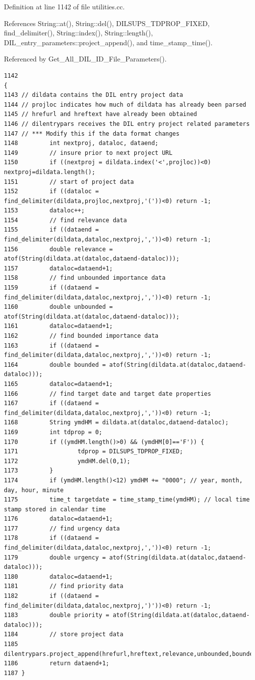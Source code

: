 Definition at line 1142 of file utilities.cc.

References String::at(), String::del(), DILSUPS\_\-TDPROP\_\-FIXED, find\_\-delimiter(), String::index(), String::length(), DIL\_\-entry\_\-parameters::project\_\-append(), and time\_\-stamp\_\-time().

Referenced by Get\_\-All\_\-DIL\_\-ID\_\-File\_\-Parameters().



\footnotesize\begin{verbatim}1142                                                                                                                                                  {
1143 // dildata contains the DIL entry project data
1144 // projloc indicates how much of dildata has already been parsed
1145 // hrefurl and hreftext have already been obtained
1146 // dilentrypars receives the DIL entry project related parameters
1147 // *** Modify this if the data format changes
1148         int nextproj, dataloc, dataend;
1149         // insure prior to next project URL
1150         if ((nextproj = dildata.index('<',projloc))<0) nextproj=dildata.length();
1151         // start of project data
1152         if ((dataloc = find_delimiter(dildata,projloc,nextproj,'('))<0) return -1;
1153         dataloc++;
1154         // find relevance data
1155         if ((dataend = find_delimiter(dildata,dataloc,nextproj,','))<0) return -1;
1156         double relevance = atof(String(dildata.at(dataloc,dataend-dataloc)));
1157         dataloc=dataend+1;
1158         // find unbounded importance data
1159         if ((dataend = find_delimiter(dildata,dataloc,nextproj,','))<0) return -1;
1160         double unbounded = atof(String(dildata.at(dataloc,dataend-dataloc)));
1161         dataloc=dataend+1;
1162         // find bounded importance data
1163         if ((dataend = find_delimiter(dildata,dataloc,nextproj,','))<0) return -1;
1164         double bounded = atof(String(dildata.at(dataloc,dataend-dataloc)));
1165         dataloc=dataend+1;
1166         // find target date and target date properties
1167         if ((dataend = find_delimiter(dildata,dataloc,nextproj,','))<0) return -1;
1168         String ymdHM = dildata.at(dataloc,dataend-dataloc);
1169         int tdprop = 0;
1170         if ((ymdHM.length()>0) && (ymdHM[0]=='F')) {
1171                 tdprop = DILSUPS_TDPROP_FIXED;
1172                 ymdHM.del(0,1);
1173         }
1174         if (ymdHM.length()<12) ymdHM += "0000"; // year, month, day, hour, minute
1175         time_t targetdate = time_stamp_time(ymdHM); // local time stamp stored in calendar time
1176         dataloc=dataend+1;
1177         // find urgency data
1178         if ((dataend = find_delimiter(dildata,dataloc,nextproj,','))<0) return -1;
1179         double urgency = atof(String(dildata.at(dataloc,dataend-dataloc)));
1180         dataloc=dataend+1;
1181         // find priority data
1182         if ((dataend = find_delimiter(dildata,dataloc,nextproj,')'))<0) return -1;
1183         double priority = atof(String(dildata.at(dataloc,dataend-dataloc)));
1184         // store project data
1185         dilentrypars.project_append(hrefurl,hreftext,relevance,unbounded,bounded,targetdate,tdprop,urgency,priority);
1186         return dataend+1;
1187 }       
\end{verbatim}\normalsize 
